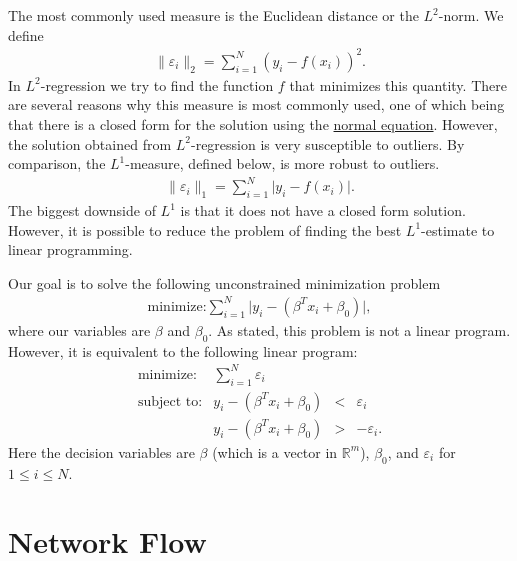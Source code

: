 \documentclass[
]{book}
\theoremstyle{definition}
\theoremstyle{definition}
\theoremstyle{definition}
\theoremstyle{definition}
\theoremstyle{remark}
\begin{document}
The most commonly used measure is the Euclidean distance or the \(L^2\)-norm. We define
\begin{align*}
  \| \varepsilon_i \|_2 = \sum \limits_{i = 1}^N (y_i - f(x_i))^2 .
\end{align*}
In \(L^2\)-regression we try to find the function \(f\) that minimizes this quantity.
There are several reasons why this measure is most commonly used, one of which being that there is a closed form for the solution using the \href{https://en.wikipedia.org/wiki/Ordinary_least_squares\#Matrix/vector_formulation}{normal equation}.
However, the solution obtained from \(L^2\)-regression is very susceptible to outliers.
By comparison, the \(L^1\)-measure, defined below, is more robust to outliers.
\begin{align*}
  \| \varepsilon_i \|_1 = \sum \limits_{i = 1}^N \lvert y_i - f(x_i) \rvert.
\end{align*}
The biggest downside of \(L^1\) is that it does not have a closed form solution.
However, it is possible to reduce the problem of finding the best \(L^1\)-estimate to linear programming.

Our goal is to solve the following unconstrained minimization problem
\begin{align*}
  \mbox{minimize:} \sum \limits_{i = 1}^N \lvert y_i - (\beta^T x_i + \beta_0) \rvert,
\end{align*}
where our variables are \(\beta\) and \(\beta_0\).
As stated, this problem is not a linear program.
However, it is equivalent to the following linear program:
\begin{equation*}
  \begin{array}{lllr}
    \mbox{minimize:} & \sum \limits_{i = 1}^N \varepsilon_i \\
    \mbox{subject to:} 
      & y_i - (\beta^T x_i + \beta_0) & < & \varepsilon_i \\
      & y_i - (\beta^T x_i + \beta_0) & > & -\varepsilon_i.
  \end{array}
\end{equation*}
Here the decision variables are \(\beta\) (which is a vector in \(\mathbb{R}^m\)), \(\beta_0\), and \(\varepsilon_i\) for \(1 \le i \le N\).

\hypertarget{network-flow}{%
\chapter{Network Flow}\label{network-flow}}
\end{document}
